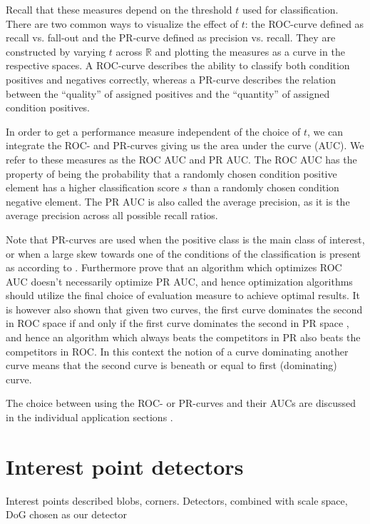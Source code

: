 \documentclass[thesis.tex]{subfiles}
\begin{document}
Recall that these measures depend on the threshold $t$ used for classification. There are two common ways to visualize the effect of $t$: the ROC-curve defined as recall vs. fall-out and the PR-curve defined as precision vs. recall. They are constructed by varying $t$ across $\mathbb{R}$ and plotting the measures as a curve in the respective spaces. A ROC-curve describes the ability to classify both condition positives and negatives correctly, whereas a PR-curve describes the relation between the ``quality'' of assigned positives and the ``quantity'' of assigned condition positives. 

In order to get a performance measure independent of the choice of $t$, we can integrate the ROC- and PR-curves giving us the area under the curve (AUC). We refer to these measures as the ROC AUC and PR AUC. The ROC AUC has the property of being the probability that a randomly chosen condition positive element has a higher classification score $s$ than a randomly chosen condition negative element. The PR AUC is also called the average precision, as it is the average precision across all possible recall ratios.

Note that PR-curves are used when the positive class is the main class of interest, or when a large skew towards one of the conditions of the classification is present as according to \citet{davis2006relationship}. Furthermore \citet{davis2006relationship} prove that an algorithm which optimizes ROC AUC doesn't necessarily optimize PR AUC, and hence optimization algorithms should utilize the final choice of evaluation measure to achieve optimal results. It is however also shown that given two curves, the first curve dominates the second in ROC space if and only if the first curve dominates the second in PR space \cite[Theorem 3.2]{davis2006relationship}, and hence an algorithm which always beats the competitors in PR also beats the competitors in ROC. In this context the notion of a curve dominating another curve means that the second curve is beneath or equal to first (dominating) curve.

The choice between using the ROC- or PR-curves and their AUCs are discussed in the individual application sections .
%
\section{Interest point detectors}
Interest points described
blobs, corners.
Detectors, combined with scale space, DoG chosen as our detector
\end{document}
